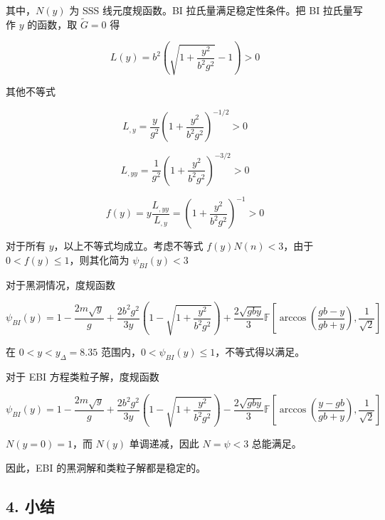 \documentclass[aps,prl,preprint,groupedaddress,showkeys]{revtex4-2}
\begin{document}
其中，$N(y)$ 为 SSS 线元度规函数。BI 拉氏量满足稳定性条件。把 BI 拉氏量写作 $y$ 的函数，取 $\tilde{G}=0$ 得

$$
L(y)
=b^2\left(\sqrt{1+\frac{y^2 }{b^2 g^2 } } - 1 \right) > 0 
$$

其他不等式

$$
L_{,y} = \frac{y }{g^2 } \left(1 + \frac{y^2 }{b^2 g^2 }  \right)^{-1/2} > 0
$$

$$
L_{,yy} = \frac{1 }{g^2 } \left(1 + \frac{y^2 }{b^2 g^2 }  \right)^{-3/2} > 0
$$

$$
f(y) = y\frac{L_{,yy} }{L_{,y} } = \left(1 + \frac{y^2 }{b^2 g^2 }  \right)^{-1} > 0
$$

对于所有 $y$，以上不等式均成立。考虑不等式 $f(y)N(n)<3$，由于 $0<f(y)\leq 1$，则其化简为 $\psi_{BI}(y)<3$

对于黑洞情况，度规函数

$$
\psi_{BI}(y)
=1-\frac{2m\sqrt{y} }{g } + \frac{2b^2 g^2 }{3y } \left(1-\sqrt{1+\frac{y^2 }{b^2 g^2 } } \right) + \frac{2\sqrt{gby} }{3 } \mathbb{F}\left[\arccos\left(\frac{gb-y }{gb+y } \right), \frac{1 }{\sqrt{2} }   \right] 
$$

在 $0<y<y_\Delta=8.35$ 范围内，$0<\psi_{BI}(y)\leq 1$，不等式得以满足。

对于 EBI 方程类粒子解，度规函数

$$
\psi_{BI}(y)
=1-\frac{2m\sqrt{y} }{g } + \frac{2b^2 g^2 }{3y } \left(1-\sqrt{1+\frac{y^2 }{b^2 g^2 } } \right) - \frac{2\sqrt{gby} }{3 } \mathbb{F}\left[\arccos\left(\frac{y-gb }{gb+y } \right), \frac{1 }{\sqrt{2} } \right]
$$

$N(y=0)=1$，而 $N(y)$ 单调递减，因此 $N=\psi<3$ 总能满足。

因此，EBI 的黑洞解和类粒子解都是稳定的。

\subsection{4. 小结}
\end{document}
